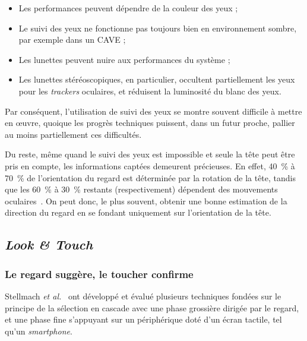 	\begin{itemize}
		\item Les performances peuvent dépendre de la couleur des yeux ;
		\item Le suivi des yeux ne fonctionne pas toujours bien en environnement sombre, par exemple dans un CAVE ;
		\item Les lunettes peuvent nuire aux performances du système ;
		\item Les lunettes stéréoscopiques, en particulier, occultent partiellement les yeux pour les \emph{trackers} oculaires, et réduisent la luminosité du blanc des yeux.
	\end{itemize}

	Par conséquent, l'utilisation de suivi des yeux se montre souvent difficile à mettre en œuvre, quoique les progrès techniques puissent, dans un futur proche, pallier au moins partiellement ces difficultés.
	
	Du reste, même quand le suivi des yeux est impossible et seule la tête peut être pris en compte, les informations captées demeurent précieuses. En effet, 40~\%{} à 70~\%{} de l'orientation du regard est déterminée par la rotation de la tête, tandis que les 60~\%{} à 30~\%{} restants (respectivement) dépendent des mouvements oculaires~\cite{gauthier1991short}. On peut donc, le plus souvent, obtenir une bonne estimation de la direction du regard en se fondant uniquement sur l'orientation de la tête.
	
	\subsection{\emph{Look \&{} Touch}}
	\subsubsection{Le regard suggère, le toucher confirme}
	Stellmach \emph{et al.}~\cite{stellmach2012look} ont développé et évalué plusieurs techniques fondées sur le principe de la sélection en cascade avec une phase grossière dirigée par le regard, et une phase fine s'appuyant sur un périphérique doté d'un écran tactile, tel qu'un \emph{smartphone}.
	
